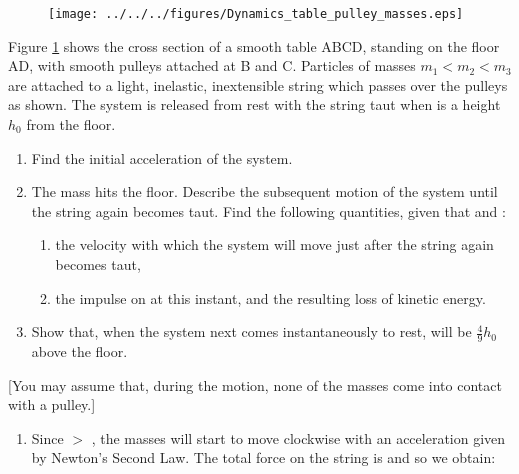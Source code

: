 
\begin{problem}[A1969AMIIQ2a] %
{\begin{figure}[h]
\centering
\texttt{[image: ../../../figures/Dynamics\_table\_pulley\_masses.eps]}
\caption{}\label{fig:Dynamics_table_pulley_masses}
\end{figure}

Figure \ref{fig:Dynamics_table_pulley_masses} shows the cross section of a smooth table ABCD, standing on the floor AD, with smooth pulleys attached at B and C. Particles of masses $m_1 < m_2 < m_3$ are attached to a light, inelastic, inextensible string which passes over the pulleys as shown. The system is released from rest with the string taut when  is a height $h_{0}$ from the floor.
\begin{enumerate}
	\item Find the initial acceleration of the system.
	\item The mass  hits the floor. Describe the subsequent motion of the system until the string again becomes taut. Find the following quantities, given that    and :
	\begin{enumerate}
		\item the velocity with which the system will move just after the string again becomes taut,
		\item the impulse on  at this instant, and the resulting loss of kinetic energy.
	\end{enumerate}
	\item Show that, when the system next comes instantaneously to rest,  will be $\frac{4}{9}h_{0}$ above the floor.
\end{enumerate}
[You may assume that, during the motion, none of the masses come into contact with a pulley.]
}
{}
{\begin{enumerate}
	\item Since  $>$ , the masses will start to move clockwise with an acceleration given by Newton's Second Law. The total force on the string is  and so we obtain:

\end{enumerate}}
\end{problem}
